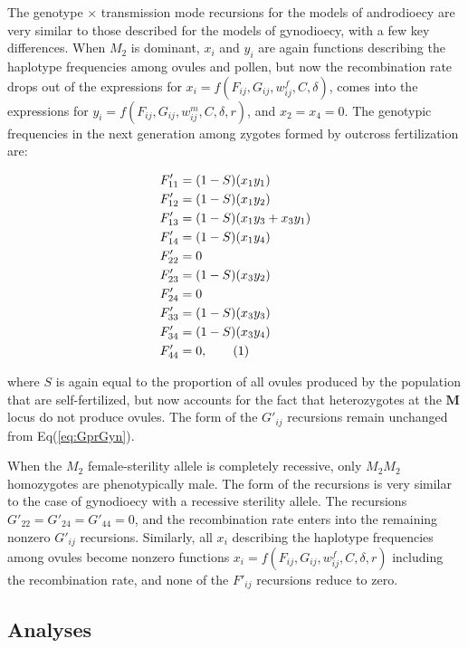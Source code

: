 \documentclass[9pt,twocolumn,twoside,lineno]{gsajnl}
\newcommand\numberthis{\addtocounter{equation}{1}\tag{\theequation}}
\begin{document}
The genotype $\times$ transmission mode recursions for the models of androdioecy are very similar to those described for the models of gynodioecy, with a few key differences. When $M_2$ is dominant, $x_{i}$ and $y_{i}$ are again functions describing the haplotype frequencies among ovules and pollen, but now the recombination rate drops out of the expressions for $x_i=f(F_{ij},G_{ij},w^f_{ij},C,\delta)$, comes into the expressions for $y_i=f(F_{ij},G_{ij},w^m_{ij},C,\delta,r)$, and $x_2=x_4=0$. The genotypic frequencies in the next generation among zygotes formed by outcross fertilization are:
\begin{linenomath}\begin{align*} \label{eq:FprAnd}
    F'_{11} &= (1 - S) (x_1 y_1) \\
    F'_{12} &= (1 - S) (x_1 y_2) \\
    F'_{13} &= (1 - S) (x_1 y_3 + x_3 y_1) \\
    F'_{14} &= (1 - S) (x_1 y_4) \\
    F'_{22} &= 0 \\
    F'_{23} &= (1 - S) (x_3 y_2) \\
    F'_{24} &= 0 \\
    F'_{33} &= (1 - S) (x_3 y_3) \\
    F'_{34} &= (1 - S) (x_3 y_4) \\
    F'_{44} &= 0, \numberthis
\end{align*} \end{linenomath}

\noindent where $S$ is again equal to the proportion of all ovules produced by the population that are self-fertilized, but now accounts for the fact that heterozygotes at the $\mathbf{M}$ locus do not produce ovules. The form of the $G'_{ij}$ recursions remain unchanged from Eq(\ref{eq:GprGyn}).

When the $M_2$ female-sterility allele is completely recessive, only $M_2M_2$ homozygotes are phenotypically male. The form of the recursions is very similar to the case of gynodioecy with a recessive sterility allele. The recursions $G'_{22}=G'_{24}=G'_{44}=0$, and the recombination rate enters into the remaining nonzero $G'_{ij}$ recursions. Similarly, all $x_i$ describing the haplotype frequencies among ovules become nonzero functions $x_i=f(F_{ij},G_{ij},w^f_{ij},C,\delta,r)$ including the recombination rate, and none of the $F'_{ij}$ recursions reduce to zero.


\subsection{Analyses}
\end{document}
